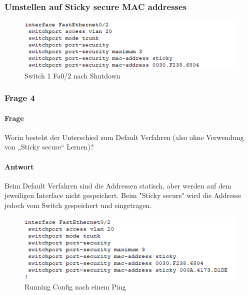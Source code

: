 \subsubsection{Umstellen auf Sticky secure MAC addresses}
\begin{figure}[!htb]
    \centering
    \includegraphics[width=.95\textwidth,keepaspectratio]{./img/config/sticky/config.png}
    \caption{Switch 1 Fa0/2 nach Shutdown}
\end{figure}
\subsubsection{Frage 4}
\paragraph{Frage}
Worin besteht der Unterschied zum Default Verfahren (also ohne
Verwendung von „Sticky secure“ Lernen)?
\paragraph{Antwort}
Beim Default Verfahren sind die Addressen statisch, aber werden auf dem jeweiligen Interface nicht gespeichert. Beim "Sticky secure" wird die Addresse jedoch vom Switch gespeichert und eingetragen.
\begin{figure}[!htb]
    \centering
    \includegraphics[width=.95\textwidth,keepaspectratio]{./img/config/sticky/result.png}
    \caption{Running Config nach einem Ping}
\end{figure}